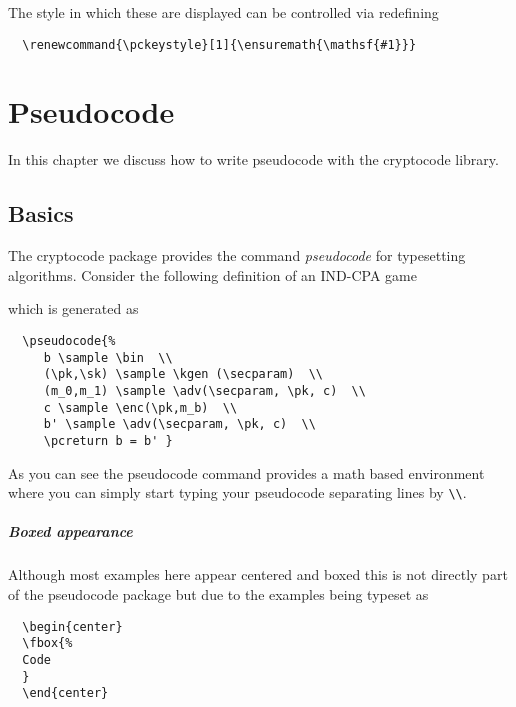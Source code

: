 \documentclass[a4paper]{report}
\begin{document}
  The style in which these are displayed can be controlled via redefining
  \begin{lstlisting}
  \renewcommand{\pckeystyle}[1]{\ensuremath{\mathsf{#1}}}
  \end{lstlisting}
  
  
  \chapter{Pseudocode}
  \label{chap:pseudocode}
  
  In this chapter we discuss how to write pseudocode with the cryptocode library.
  
  \section{Basics}
  
  The cryptocode package provides the command \emph{pseudocode} for typesetting algorithms.
  Consider the following definition of an IND-CPA game
  \begin{center}
  \end{center}
  which is generated as
  \begin{lstlisting}
  \pseudocode{%
	 b \sample \bin  \\
	 (\pk,\sk) \sample \kgen (\secparam)  \\
	 (m_0,m_1) \sample \adv(\secparam, \pk, c)  \\
	 c \sample \enc(\pk,m_b)  \\
	 b' \sample \adv(\secparam, \pk, c)  \\
	 \pcreturn b = b' }
  \end{lstlisting}
  As you can see the pseudocode command provides a math based environment where you can simply start typing your pseudocode
  separating lines by \lstinline$\\$.
  
  
  \paragraph{Boxed appearance}
  Although most examples here appear centered and boxed this is not directly part of the pseudocode package but due to the examples being 
  typeset as
  \begin{lstlisting}
  \begin{center}
  \fbox{%
  Code
  }
  \end{center}
  \end{lstlisting}
  
\end{document}
